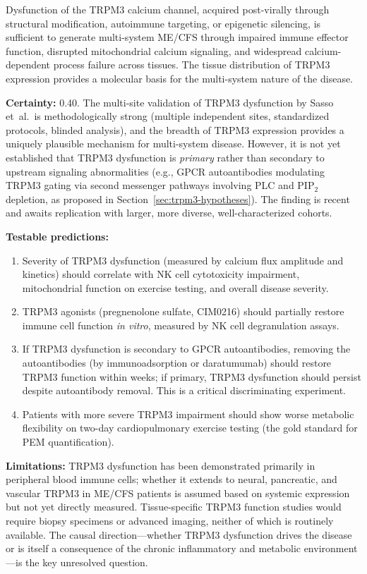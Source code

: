 \begin{hypothesis}
\label{hyp:trpm3-root}
Dysfunction of the TRPM3 calcium channel, acquired post-virally through structural modification, autoimmune targeting, or epigenetic silencing, is sufficient to generate multi-system ME/CFS through impaired immune effector function, disrupted mitochondrial calcium signaling, and widespread calcium-dependent process failure across tissues. The tissue distribution of TRPM3 expression provides a molecular basis for the multi-system nature of the disease.

\textbf{Certainty:} 0.40. The multi-site validation of TRPM3 dysfunction by Sasso et~al.\ is methodologically strong (multiple independent sites, standardized protocols, blinded analysis), and the breadth of TRPM3 expression provides a uniquely plausible mechanism for multi-system disease. However, it is not yet established that TRPM3 dysfunction is \emph{primary} rather than secondary to upstream signaling abnormalities (e.g., GPCR autoantibodies modulating TRPM3 gating via second messenger pathways involving PLC and PIP$_2$ depletion, as proposed in Section~\ref{sec:trpm3-hypotheses}). The finding is recent and awaits replication with larger, more diverse, well-characterized cohorts.

\textbf{Testable predictions:}
\begin{enumerate}
    \item Severity of TRPM3 dysfunction (measured by calcium flux amplitude and kinetics) should correlate with NK cell cytotoxicity impairment, mitochondrial function on exercise testing, and overall disease severity.
    \item TRPM3 agonists (pregnenolone sulfate, CIM0216) should partially restore immune cell function \emph{in vitro}, measured by NK cell degranulation assays.
    \item If TRPM3 dysfunction is secondary to GPCR autoantibodies, removing the autoantibodies (by immunoadsorption or daratumumab) should restore TRPM3 function within weeks; if primary, TRPM3 dysfunction should persist despite autoantibody removal. This is a critical discriminating experiment.
    \item Patients with more severe TRPM3 impairment should show worse metabolic flexibility on two-day cardiopulmonary exercise testing (the gold standard for PEM quantification).
\end{enumerate}

\textbf{Limitations:} TRPM3 dysfunction has been demonstrated primarily in peripheral blood immune cells; whether it extends to neural, pancreatic, and vascular TRPM3 in ME/CFS patients is assumed based on systemic expression but not yet directly measured. Tissue-specific TRPM3 function studies would require biopsy specimens or advanced imaging, neither of which is routinely available. The causal direction---whether TRPM3 dysfunction drives the disease or is itself a consequence of the chronic inflammatory and metabolic environment---is the key unresolved question.
\end{hypothesis}


